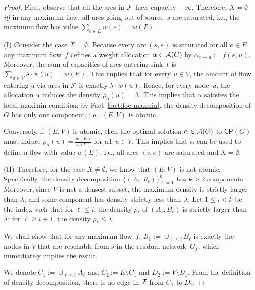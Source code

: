 \begin{proof}
First, observe that all the arcs in $\mathcal {F}$ have capacity~$+\infty$.
Therefore, $X = \emptyset$ \emph{iff} in any maximum flow,
all arcs going out of source~$s$ are saturated, i.e.,
the maximum flow has value $\sum_{e \in E} w(e) = w(E)$.

\noindent (I)
Consider the case $X = \emptyset$. Because every arc $(s, e)$ is saturated
for all $e \in E$, any maximum flow~$f$ defines
a weight allocation $\alpha \in \mathcal {A}(G)$
by $\alpha_{e \to u} := f(e,u)$.
Moreover, the sum of capacities of arcs entering
sink~$t$ is $\sum_{u \in V} \lambda \cdot w(u) = w(E)$.
This implies that for every $u \in V$, the amount of flow
entering $u$ via arcs in $\mathcal{F}$ is exactly $\lambda \cdot w(u)$.
Hence, for every node~$u$, the allocation $\alpha$ induces
the density $\rho_\alpha(u) = \lambda$.  This implies that
$\alpha$ satisfies the local maximin condition;
by Fact~\ref{fact:loc-maxmin}, the density decomposition of $G$
has only one component, i.e., $(E, V)$ is atomic.

Conversely, if $(E,V)$ is atomic, then the optimal solution $\alpha \in \mathcal {A}(G)$ to
$\mathsf{CP}(G)$ must induce $\rho_\alpha(u) = \frac{w(E)}{w(V)}$ for all~$u \in V$.
This implies that $\alpha$ can be used to define a flow with
value $w(E)$, i.e., all arcs $(s, e)$ are saturated and $X = \emptyset$.


\noindent (II) Therefore, for the case $X \neq \emptyset$,
we know that $(E, V)$ is not atomic.  Specifically,
the density decomposition 
$\{(A_\ell, B_\ell)\}_{\ell = 1}^k$ has $k \geq 2$ components.
Moreover, since $V$ is not a densest subset,
the maximum density is strictly larger than $\lambda$,
and some component has density strictly less than~$\lambda$.
Let $1 \leq i < k$ be the index such that
for $\ell \leq i$, the density $\rho_\ell$ of $(A_\ell, B_\ell)$ is strictly larger than $\lambda$;
for $\ell \geq i +1$, the density $\rho_\ell \leq \lambda$.


We shall show that for any maximum flow~$f$,
$D_1 := \cup_{\ell \leq i} B_\ell$ is exactly the nodes in $V$
that are reachable from $s$ in the residual network~$\widetilde{G}_f$, which immediately implies the result.

We denote $C_1 := \cup_{\ell \leq i} A_\ell$
and $C_2 := E \setminus C_1$ and $D_2 := V \setminus D_1$.
From the definition of density decomposition,
there is no edge in $\mathcal {F}$ from $C_1$ to $D_2$.



\end{proof}

